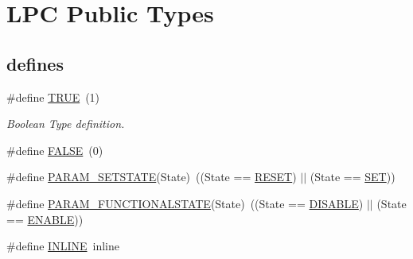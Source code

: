 \hypertarget{group___l_p_c___types___public___types}{}\section{L\+PC Public Types}
\label{group___l_p_c___types___public___types}
\subsection*{\textquotesingle{}defines\textquotesingle{}}
\begin{DoxyCompactItemize}
\item 
\#define \hyperlink{group___l_p_c___types___public___types_gaa8cecfc5c5c054d2875c03e77b7be15d}{T\+R\+UE}~(1)
\begin{DoxyCompactList}\small\item\em Boolean Type definition. \end{DoxyCompactList}\item 
\#define \hyperlink{group___l_p_c___types___public___types_gaa93f0eb578d23995850d61f7d61c55c1}{F\+A\+L\+SE}~(0)
\item 
\#define \hyperlink{group___l_p_c___types___public___types_gafb6827323e4c501477936a84bd733b4f}{P\+A\+R\+A\+M\+\_\+\+S\+E\+T\+S\+T\+A\+TE}(State)~((State == \hyperlink{group___l_p_c___types___public___types_gga89136caac2e14c55151f527ac02daaffa589b7d94a3d91d145720e2fed0eb3a05}{R\+E\+S\+ET}) $\vert$$\vert$ (State == \hyperlink{group___l_p_c___types___public___types_gga89136caac2e14c55151f527ac02daaffab44c8101cc294c074709ec1b14211792}{S\+ET}))
\item 
\#define \hyperlink{group___l_p_c___types___public___types_ga5475435ea985fe5abbf2048e87e3e682}{P\+A\+R\+A\+M\+\_\+\+F\+U\+N\+C\+T\+I\+O\+N\+A\+L\+S\+T\+A\+TE}(State)~((State == \hyperlink{group___l_p_c___types___public___types_ggac9a7e9a35d2513ec15c3b537aaa4fba1ad3a9df141be0ccf10389b640f492b26d}{D\+I\+S\+A\+B\+LE}) $\vert$$\vert$ (State == \hyperlink{group___l_p_c___types___public___types_ggac9a7e9a35d2513ec15c3b537aaa4fba1a7d46875fa3ebd2c34d2756950eda83bf}{E\+N\+A\+B\+LE}))
\item 
\#define \hyperlink{group___l_p_c___types___public___types_ga2eb6f9e0395b47b8d5e3eeae4fe0c116}{I\+N\+L\+I\+NE}~inline
\end{DoxyCompactItemize}
